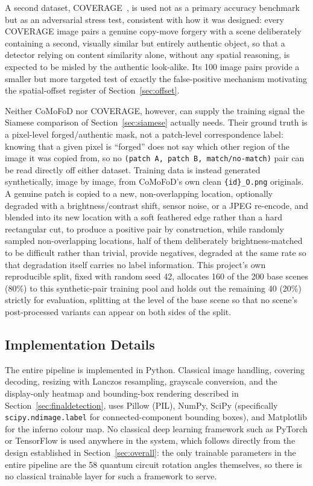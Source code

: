 \documentclass[conference]{IEEEtran}
\begin{document}
A second dataset, COVERAGE~\cite{coverage2016}, is used not as a primary accuracy benchmark but as an adversarial stress test, consistent with how it was designed: every COVERAGE image pairs a genuine copy-move forgery with a scene deliberately containing a second, visually similar but entirely authentic object, so that a detector relying on content similarity alone, without any spatial reasoning, is expected to be misled by the authentic look-alike. Its 100 image pairs provide a smaller but more targeted test of exactly the false-positive mechanism motivating the spatial-offset register of Section~\ref{sec:offset}.

Neither CoMoFoD nor COVERAGE, however, can supply the training signal the Siamese comparison of Section~\ref{sec:siamese} actually needs. Their ground truth is a pixel-level forged/authentic mask, not a patch-level correspondence label: knowing that a given pixel is ``forged'' does not say which other region of the image it was copied from, so no \texttt{(patch A, patch B, match/no-match)} pair can be read directly off either dataset. Training data is instead generated synthetically, image by image, from CoMoFoD's own clean \texttt{\{id\}\_O.png} originals. A genuine patch is copied to a new, non-overlapping location, optionally degraded with a brightness/contrast shift, sensor noise, or a JPEG re-encode, and blended into its new location with a soft feathered edge rather than a hard rectangular cut, to produce a positive pair by construction, while randomly sampled non-overlapping locations, half of them deliberately brightness-matched to be difficult rather than trivial, provide negatives, degraded at the same rate so that degradation itself carries no label information. This project's own reproducible split, fixed with random seed 42, allocates 160 of the 200 base scenes (80\%) to this synthetic-pair training pool and holds out the remaining 40 (20\%) strictly for evaluation, splitting at the level of the base scene so that no scene's post-processed variants can appear on both sides of the split.

\subsection{Implementation Details}\label{sec:impl}
The entire pipeline is implemented in Python. Classical image handling, covering decoding, resizing with Lanczos resampling, grayscale conversion, and the display-only heatmap and bounding-box rendering described in Section~\ref{sec:finaldetection}, uses Pillow (PIL), NumPy, SciPy (specifically \texttt{scipy.ndimage.label} for connected-component bounding boxes), and Matplotlib for the inferno colour map. No classical deep learning framework such as PyTorch or TensorFlow is used anywhere in the system, which follows directly from the design established in Section~\ref{sec:overall}: the only trainable parameters in the entire pipeline are the 58 quantum circuit rotation angles themselves, so there is no classical trainable layer for such a framework to serve.
\end{document}
